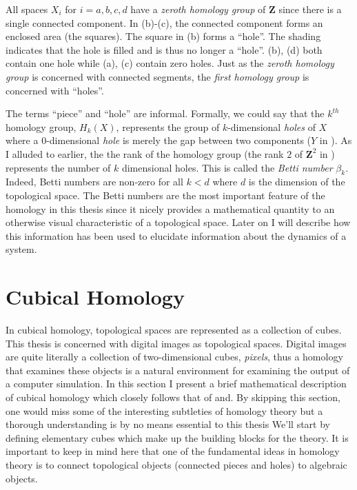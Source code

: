 All spaces $X_i$ for $i = a,b,c,d$ have a \textit{zeroth homology group} of $\mathbf{Z}$ since there is a single connected component. In (b)-(c), the connected component forms an enclosed area (\eg the squares). The square in (b) forms a ``hole''. The shading indicates that the hole is filled and is thus no longer a ``hole''. (b), (d) both contain one hole while (a), (c) contain zero holes. Just as the \textit{zeroth homology group} is concerned with connected segments, the \textit{first homology group} is concerned with ``holes''.

The terms ``piece'' and ``hole'' are informal. Formally, we could say that the $k^{th}$ homology group, $H_k(X)$, represents the group of $k$-dimensional \textit{holes} of $X$ where a 0-dimensional \textit{hole} is merely the gap between two components (\eg $Y$ in ). As I alluded to earlier, the the rank of the homology group (\eg the rank $2$ of $\mathbf{Z}^2$ in ) represents the number of $k$ dimensional holes. This is called the \textit{Betti number} $\beta_k$. Indeed, Betti numbers are non-zero for all $k < d$ where $d$ is the dimension of the topological space. The Betti numbers are the most important feature of the homology in this thesis since it nicely provides a mathematical quantity to an otherwise visual characteristic of a topological space. Later on I will describe how this information has been used to elucidate information about the dynamics of a system.

\section{Cubical Homology} \label{ch2:cubicalhomology}

In cubical homology, topological spaces are represented as a collection of cubes. This thesis is concerned with digital images as topological spaces. Digital images are quite literally a collection of two-dimensional cubes, \textit{pixels}, thus a homology that examines these objects is a natural environment for examining the output of a computer simulation. In this section I present a brief mathematical description of cubical homology which closely follows that of and. By skipping this section, one would miss some of the interesting subtleties of homology theory but a thorough understanding is by no means essential to this thesis We'll start by defining elementary cubes which make up the building blocks for the theory. It is important to keep in mind here that one of the fundamental ideas in homology theory is to connect topological objects (\eg connected pieces and holes) to algebraic objects.

